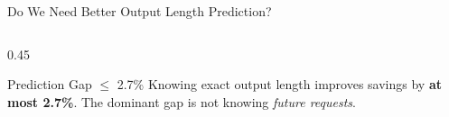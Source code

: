 \documentclass[aspectratio=169,10pt]{beamer}
\begin{document}
\begin{frame}{Do We Need Better Output Length Prediction?}
\begin{columns}[T]
\begin{column}{0.45\textwidth}
    \vspace{0.1cm}
    \begin{exampleblock}{Prediction Gap $\leq$ 2.7\%}
    \scriptsize
    Knowing exact output length improves savings by \textbf{at most 2.7\%}.
    The dominant gap is not knowing \textit{future requests}.
    \end{exampleblock}

    \vspace{0.05cm}
\end{column}
\end{columns}
\end{frame}
\end{document}
